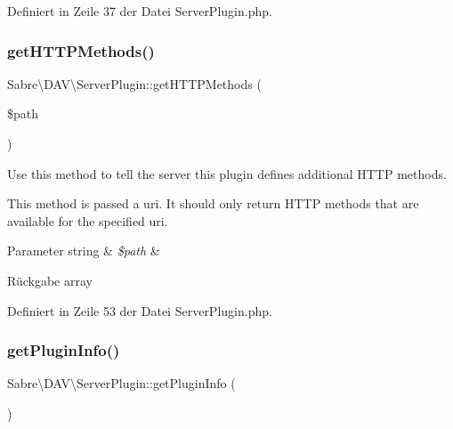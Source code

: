 Definiert in Zeile 37 der Datei Server\+Plugin.\+php.

\mbox{\label{class_sabre_1_1_d_a_v_1_1_server_plugin_a1c68444d4e319cfd8f839380602fbbd3}} 
\subsubsection{\texorpdfstring{get\+H\+T\+T\+P\+Methods()}{getHTTPMethods()}}
{\footnotesize\ttfamily Sabre\textbackslash{}\+D\+A\+V\textbackslash{}\+Server\+Plugin\+::get\+H\+T\+T\+P\+Methods (\begin{DoxyParamCaption}\item[{}]{\$path }\end{DoxyParamCaption})}

Use this method to tell the server this plugin defines additional H\+T\+TP methods.

This method is passed a uri. It should only return H\+T\+TP methods that are available for the specified uri.


\begin{DoxyParams}[1]{Parameter}
string & {\em \$path} & \\
\hline
\end{DoxyParams}
\begin{DoxyReturn}{Rückgabe}
array 
\end{DoxyReturn}


Definiert in Zeile 53 der Datei Server\+Plugin.\+php.

\mbox{\label{class_sabre_1_1_d_a_v_1_1_server_plugin_ac1a279060733c3a19d4fd1aaab00d01c}} 
\subsubsection{\texorpdfstring{get\+Plugin\+Info()}{getPluginInfo()}}
{\footnotesize\ttfamily Sabre\textbackslash{}\+D\+A\+V\textbackslash{}\+Server\+Plugin\+::get\+Plugin\+Info (\begin{DoxyParamCaption}{ }\end{DoxyParamCaption})}

